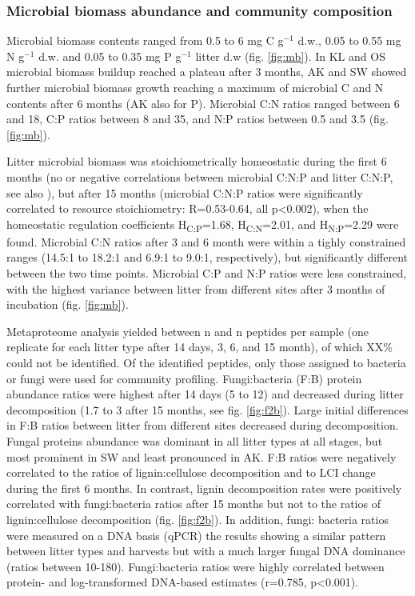 \subsubsection*{Microbial biomass abundance and community composition}
Microbial biomass contents ranged from 0.5 to 6 mg C g$^{-1}$ d.w., 0.05 to 0.55 mg N g$^{-1}$ d.w. and 0.05 to 0.35 mg P g$^{-1}$ litter d.w (fig. \ref{fig:mb}). In KL and OS microbial biomass buildup reached a plateau after 3 months, AK and SW showed further microbial biomass growth reaching a maximum of microbial C and N contents after 6 months (AK also for P). Microbial C:N ratios ranged between 6 and 18, C:P ratios between 8 and 35, and N:P ratios between 0.5 and 3.5 (fig. \ref{fig:mb}).

Litter microbial biomass was stoichiometrically homeostatic during the first 6 months (no or negative correlations between microbial C:N:P and litter C:N:P, see also \cite{Mooshammer2011}), but after 15 months (microbial C:N:P ratios were significantly correlated to resource stoichiometry: R=0.53-0.64, all p\textless 0.002), when the homeostatic regulation coefficients \cite{Sterner2002} H\textsubscript{C:P}=1.68, H\textsubscript{C:N}=2.01, and H\textsubscript{N:P}=2.29 were found. Microbial C:N ratios after 3 and 6 month were within a tighly constrained ranges (14.5:1 to 18.2:1 and 6.9:1 to 9.0:1, respectively), but significantly different between the two time points. Microbial C:P and N:P ratios were less constrained, with the highest variance between litter from different sites after 3 months of incubation (fig. \ref{fig:mb}).

Metaproteome analysis yielded between n and n peptides per sample (one replicate for each litter type after 14 days, 3, 6, and 15 month), of which XX\% could not be identified. Of the identified peptides, only those assigned to bacteria or fungi were used for community profiling. Fungi:bacteria (F:B) protein abundance ratios were highest after 14 days (5 to 12) and decreased during litter decomposition (1.7 to 3 after 15 months, see fig. \ref{fig:f2b}). Large initial differences in F:B ratios between litter from different sites decreased during decomposition. Fungal proteins abundance was dominant in all litter types at all stages, but most prominent in SW and least pronounced in  AK. F:B ratios were negatively correlated to the ratios of lignin:cellulose decomposition and to LCI change during the first 6 months. In contrast, lignin decomposition rates were positively correlated with fungi:bacteria ratios after 15 months but not to the ratios of lignin:cellulose decomposition (fig. \ref{fig:f2b}). In addition, fungi: bacteria ratios were measured on a DNA basis (qPCR) the results showing a similar pattern between litter types and harvests but with a much larger fungal DNA dominance (ratios between 10-180). Fungi:bacteria ratios were highly correlated between protein- and log-transformed DNA-based estimates (r=0.785, p\textless 0.001).

